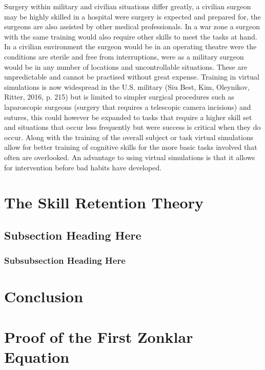 \documentclass[10pt,journal,compsoc]{IEEEtran}
\begin{document}
	Surgery within military and civilian situations differ greatly, a civilian surgeon may be highly skilled in a hospital were surgery is expected and prepared for, the surgeons are also assisted by other medical professionals. In a war zone a surgeon with the same training would also require other skills to meet the tasks at hand. In a civilian environment the surgeon would be in an operating theatre were the conditions are sterile and free from interruptions, were as a military surgeon would be in any number of locations and uncontrollable situations. These are unpredictable and cannot be practised without great expense. \newline \newline
	Training in virtual simulations is now widespread in the U.S. military (Siu Best, Kim, Oleynikov, Ritter, 2016, p. 215) but is limited to simpler surgical procedures such as laparoscopic surgeons (surgery that requires a telescopic camera incisions) and sutures, this could however be expanded to tasks that require a higher skill set and situations that occur less frequently but were success is critical when they do occur. Along with the training of the overall subject or task virtual simulations allow for better training of cognitive skills for the more basic tasks involved that often are overlooked. \newline
	An advantage to using virtual simulations is that it allows for intervention before bad habits have developed. 
	
	
	\section {The Skill Retention Theory}
	
	
	
	\subsection{Subsection Heading Here}
	
	\subsubsection{Subsubsection Heading Here}
	
	
	\section{Conclusion}
	
	
	
	\appendices
	\section{Proof of the First Zonklar Equation}
\end{document}
